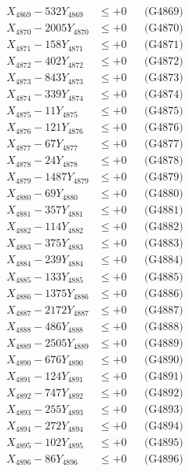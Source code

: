 \documentclass[a4paper,10pt]{article}
\begin{document}
{\begin{align}
X_{4869} - 532Y_{4869} &\leq +0 && \text{(G4869)} \\
X_{4870} - 2005Y_{4870} &\leq +0 && \text{(G4870)} \\
\allowbreak
X_{4871} - 158Y_{4871} &\leq +0 && \text{(G4871)} \\
X_{4872} - 402Y_{4872} &\leq +0 && \text{(G4872)} \\
X_{4873} - 843Y_{4873} &\leq +0 && \text{(G4873)} \\
X_{4874} - 339Y_{4874} &\leq +0 && \text{(G4874)} \\
X_{4875} - 11Y_{4875} &\leq +0 && \text{(G4875)} \\
X_{4876} - 121Y_{4876} &\leq +0 && \text{(G4876)} \\
X_{4877} - 67Y_{4877} &\leq +0 && \text{(G4877)} \\
X_{4878} - 24Y_{4878} &\leq +0 && \text{(G4878)} \\
X_{4879} - 1487Y_{4879} &\leq +0 && \text{(G4879)} \\
X_{4880} - 69Y_{4880} &\leq +0 && \text{(G4880)} \\
\allowbreak
X_{4881} - 357Y_{4881} &\leq +0 && \text{(G4881)} \\
X_{4882} - 114Y_{4882} &\leq +0 && \text{(G4882)} \\
X_{4883} - 375Y_{4883} &\leq +0 && \text{(G4883)} \\
X_{4884} - 239Y_{4884} &\leq +0 && \text{(G4884)} \\
X_{4885} - 133Y_{4885} &\leq +0 && \text{(G4885)} \\
X_{4886} - 1375Y_{4886} &\leq +0 && \text{(G4886)} \\
X_{4887} - 2172Y_{4887} &\leq +0 && \text{(G4887)} \\
X_{4888} - 486Y_{4888} &\leq +0 && \text{(G4888)} \\
X_{4889} - 2505Y_{4889} &\leq +0 && \text{(G4889)} \\
X_{4890} - 676Y_{4890} &\leq +0 && \text{(G4890)} \\
\allowbreak
X_{4891} - 124Y_{4891} &\leq +0 && \text{(G4891)} \\
X_{4892} - 747Y_{4892} &\leq +0 && \text{(G4892)} \\
X_{4893} - 255Y_{4893} &\leq +0 && \text{(G4893)} \\
X_{4894} - 272Y_{4894} &\leq +0 && \text{(G4894)} \\
X_{4895} - 102Y_{4895} &\leq +0 && \text{(G4895)} \\
X_{4896} - 86Y_{4896} &\leq +0 && \text{(G4896)} \\

\end{align}}
\end{document}
